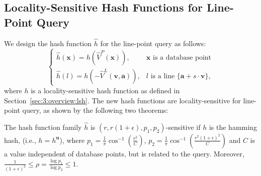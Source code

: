 %
%


\subsection{Locality-Sensitive Hash Functions for Line-Point Query}
\label{sec:3:linelsh:lshhash}
We design the hash function $\hat{h}$ for the line-point query as follows:
\begin{equation}
  \label{eq:3:lphash}
  \begin{cases}
    \hat{h}(\mathbf x) = h(\hat{V}^P(\mathbf x)), & \mathbf x \text{ is a database point} \\
    \hat{h}(l) = h(-\hat{V}^L(\mathbf v, \mathbf a)), & l \text{ is a line }\{\mathbf a + s \cdot \mathbf v\},
  \end{cases}
\end{equation}
where $h$ is a locality-sensitive hash function as defined in Section~\ref{sec:3:overview:lsh}. The new hash functions are locality-sensitive for line-point query, as shown by the following two theorems:
\begin{theorem}
  \label{thm:3:hamminghash}
  The hash function family $\hat{h}$ is $(r, r(1+\epsilon), p_1, p_2)$-sensitive if $h$ is the hamming hash, (i.e., $h = h^{\mathbf u}$), where $p_1 = \frac{1}{\pi} \cos^{-1}(\frac{r^2}{C})$, $p_2 = \frac{1}{\pi} \cos^{-1}(\frac{r^2(1+\epsilon)^2}{C})$ and $C$ is a value independent of database points, but is related to the query. Moreover, $\frac{1}{(1+\epsilon)^2} \leq \rho = \frac{\log p_1}{\log p_2} \leq 1$.
\end{theorem}

